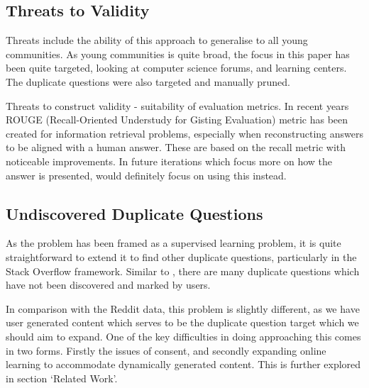 \documentclass[journal]{IEEEtran}
\begin{document}
\subsection{Threats to Validity}

Threats include the ability of this approach to generalise to all young communities. As young communities is quite broad, the focus in this paper has been quite targeted, looking at computer science forums, and learning centers. The duplicate questions were also targeted and manually pruned. 

Threats to construct validity - suitability of evaluation metrics. In recent years ROUGE (Recall-Oriented Understudy for Gisting Evaluation)\cite{rouge} metric has been created for information retrieval problems, especially when reconstructing answers to be aligned with a human answer. These are based on the recall metric with noticeable improvements. In future iterations which focus more on how the answer is presented, would definitely focus on using this instead.

\subsection{Undiscovered Duplicate Questions}

As the problem has been framed as a supervised learning problem, it is quite straightforward to extend it to find other duplicate questions, particularly in the Stack Overflow framework. Similar to \cite{dupred}, there are many duplicate questions which have not been discovered and marked by users. 

In comparison with the Reddit data, this problem is slightly different, as we have user generated content which serves to be the duplicate question target which we should aim to expand. One of the key difficulties in doing approaching this comes in two forms. Firstly the issues of consent\cite{issues}, and secondly expanding online learning to accommodate dynamically generated content\cite{pal}\cite{supermooc}. This is further explored in section `Related Work'. 
\end{document}
